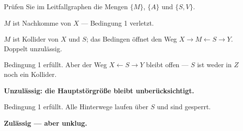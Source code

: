 \begin{aufgabe}
Prüfen Sie im Leitfallgraphen die Mengen $\{M\}$, $\{A\}$ und $\{S,V\}$.

\loesung
{}
$M$ ist Nachkomme von $X$ --- Bedingung 1 verletzt.

 $M$ ist Kollider von $X$ und $S$; das Bedingen öffnet den Weg $X \to M \leftarrow S \to Y$. Doppelt unzulässig.

Bedingung 1 erfüllt. Aber der Weg $X \leftarrow S \to Y$ bleibt offen --- $S$ ist weder in $Z$ noch ein Kollider.

\begin{center}
\begin{minipage}{0.9\textwidth}
\textbf{Unzulässig: die Hauptstörgröße bleibt unberücksichtigt.}
\end{minipage}
\end{center}

Bedingung 1 erfüllt. Alle Hinterwege laufen über $S$ und sind gesperrt.

\begin{center}
\begin{minipage}{0.9\textwidth}
\textbf{Zulässig --- aber unklug.}
\end{minipage}
\end{center}

\begin{center}
\begin{minipage}{0.88\textwidth}
\end{minipage}
\end{center}
\end{aufgabe}

